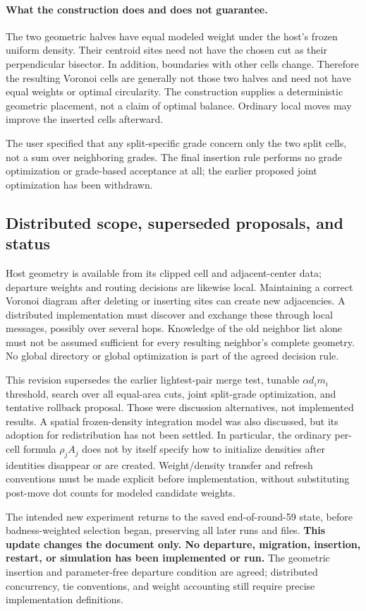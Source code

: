 \paragraph{What the construction does and does not guarantee.}
The two geometric halves have equal modeled weight under the host's frozen
uniform density. Their centroid sites need not have the chosen cut as their
perpendicular bisector. In addition, boundaries with other cells change.
Therefore the resulting Voronoi cells are generally not those two halves and
need not have equal weights or optimal circularity. The construction supplies
a deterministic geometric placement, not a claim of optimal balance.
Ordinary local moves may improve the inserted cells afterward.

The user specified that any split-specific grade concern only the two split
cells, not a sum over neighboring grades. The final insertion rule performs
no grade optimization or grade-based acceptance at all; the earlier proposed
joint optimization has been withdrawn.

\subsection{Distributed scope, superseded proposals, and status}
Host geometry is available from its clipped cell and adjacent-center data;
departure weights and routing decisions are likewise local. Maintaining a
correct Voronoi diagram after deleting or inserting sites can create new
adjacencies. A distributed implementation must discover and exchange these
through local messages, possibly over several hops. Knowledge of the old
neighbor list alone must not be assumed sufficient for every resulting
neighbor's complete geometry. No global directory or global optimization is
part of the agreed decision rule.

This revision supersedes the earlier lightest-pair merge test, tunable
$\alpha d_i m_i$ threshold, search over all equal-area cuts, joint split-grade
optimization, and tentative rollback proposal. Those were discussion
alternatives, not implemented results. A spatial frozen-density integration
model was also discussed, but its adoption for redistribution has not been
settled. In particular, the ordinary per-cell formula $\rho_j A_j$ does not
by itself specify how to initialize densities after identities disappear or
are created. Weight/density transfer and refresh conventions must be made
explicit before implementation, without substituting post-move dot counts
for modeled candidate weights.

The intended new experiment returns to the saved end-of-round-59 state,
before badness-weighted selection began, preserving all later runs and files.
\textbf{This update changes the document only. No departure, migration,
insertion, restart, or simulation has been implemented or run.}
The geometric insertion and parameter-free departure condition are agreed;
distributed concurrency, tie conventions, and weight accounting still require
precise implementation definitions.
